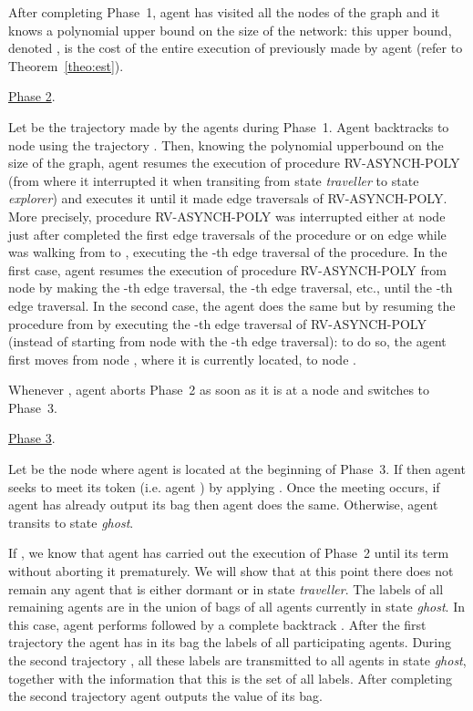 \documentclass [11pt] {article}
\begin{document}
{After completing Phase~1, agent  has visited all the nodes of the graph and it knows a polynomial upper bound on the size  of the network: this upper bound, denoted , is the cost of the entire execution of  previously made by agent  (refer to Theorem~\ref{theo:est}).} 

\noindent  \underline{Phase 2}.



{Let  be the trajectory made by the agents during Phase~1. Agent  backtracks to node  using the trajectory . Then, knowing the polynomial upperbound  on the size of the graph, agent  resumes the execution of procedure RV-ASYNCH-POLY (from where it interrupted it when transiting from state {\em traveller} to state {\em explorer}) and executes it until it made  edge traversals of RV-ASYNCH-POLY. More precisely, procedure RV-ASYNCH-POLY was interrupted either at node  just after  completed the first  edge traversals of the procedure or on edge  while  was walking from  to , executing the -th edge traversal of the procedure. In the first case, agent  resumes the execution of procedure RV-ASYNCH-POLY from node  by making the -th edge traversal, the -th edge traversal, etc., until the -th edge traversal. In the second case, the agent does the same but by resuming the procedure from  by executing the -th edge traversal of RV-ASYNCH-POLY (instead of starting from node  with the -th edge traversal): to do so, the agent first moves from node , where it is currently located, to node .}

{Whenever , agent  aborts Phase~2 as soon as it is at a node and switches to Phase~3.}

\noindent  \underline{Phase 3}.


{Let  be the node where agent  is located at the beginning of Phase~3.
If  then agent  seeks to meet its token (i.e. agent ) by applying . Once the meeting occurs, if agent  has already output its bag then agent  does the same. Otherwise, agent  transits to state {\em ghost}.}

{If , we know that agent  has carried out the execution of Phase~2 until its term without aborting it prematurely. We will show that
at this point  there does not remain any agent that is either dormant or in state {\em traveller}. The labels of all remaining agents are in the union of bags of all agents currently in state {\em ghost}. In this case, agent   performs  followed by a complete backtrack .
After the first trajectory  the agent has in its bag the labels of all participating agents.
During the second trajectory , all these labels are transmitted to all agents in state {\em ghost}, together with the information that this is the set of all labels. After completing the second trajectory
agent  outputs the value of its bag.}
\end{document}

